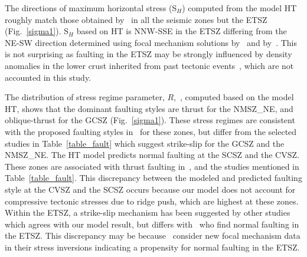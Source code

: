 \documentclass[draft,linenumbers]{agujournal2018}
\begin{document}
  
%
%
The directions of maximum horizontal stress (S$_H$) computed from the model HT roughly match those obtained by~\citet{levandowski2018updated} in all the seismic zones but the ETSZ (Fig.~\ref{sigma1}).  S$_{H}$ based on HT is NNW-SSE in the ETSZ differing from the NE-SW direction determined using focal mechanism solutions by~\citet{levandowski2018updated} and by~\citet{mazzotti2010state}. This is not surprising as faulting in the ETSZ may be strongly influenced by density anomalies in the lower crust inherited from past tectonic events~\citep{levandowski2018updated}, which are not accounted in this study.

The distribution of stress regime parameter, $R$,~\citep{delvaux1997paleostress,simpson1997quantifying}, computed based on the model HT, shows that the dominant faulting styles are thrust for the NMSZ\_NE, and oblique-thrust for the GCSZ (Fig.~\ref{sigma1}). These stress regimes are consistent with the proposed faulting styles in~\citet{levandowski2018updated} for these zones, but differ from the selected studies in Table~\ref{table_fault} which suggest strike-slip for the GCSZ and the NMSZ\_NE.  
The HT model predicts normal faulting at the SCSZ and the CVSZ. These zones are associated with thrust faulting in~\citet{levandowski2018updated}, and the studies mentioned in Table~\ref{table_fault}. This discrepancy between the modeled and predicted faulting style at the CVSZ and the SCSZ occurs because our model does not account for compressive tectonic stresses due to ridge push, which are highest at these zones. Within the ETSZ, a strike-slip mechanism has been suggested by other studies~\citep[][]{chapman1997statistical, mazzotti2010state, powell2016grenville} which agrees with our model result, but differs with~\citet{cooley2015new, levandowski2018updated} who find normal faulting in the ETSZ.  This discrepancy may be because~\citet{cooley2015new, levandowski2018updated} consider new focal mechanism data in their stress inversions indicating a propensity for normal faulting in the ETSZ.
\end{document}
